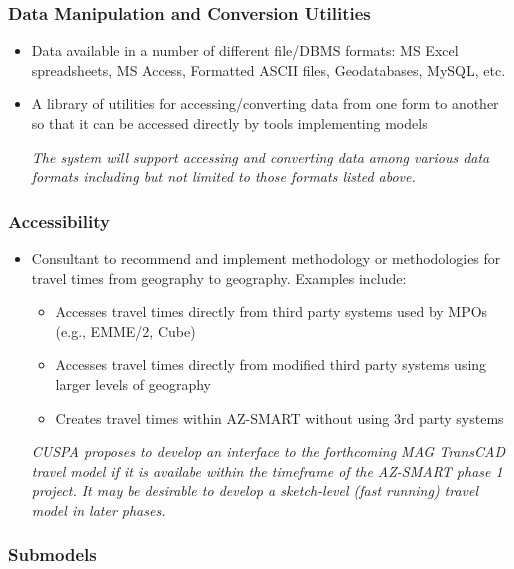 \documentclass[titlepage]{article}
\begin{document}
\subsubsection{Data Manipulation and Conversion Utilities}

\begin{itemize}

\item Data available in a number of different file/DBMS formats: MS Excel spreadsheets, MS Access, Formatted ASCII files, Geodatabases, MySQL, etc.
\item A library of utilities for accessing/converting data from one form to another so that it can be accessed directly by tools implementing models

\emph{The system will support accessing and converting data among various data formats including but not limited to those formats listed above.}

\end{itemize}

\subsubsection{Accessibility}

\begin{itemize}

\item Consultant to recommend and implement methodology or methodologies for travel times from geography to geography. Examples include:
\begin{itemize}
\item Accesses travel times directly from third party systems used by MPOs (e.g., EMME/2, Cube)
\item Accesses travel times directly from modified third party systems using larger levels of geography
\item Creates travel times within AZ-SMART without using 3rd party systems
\end{itemize}

\emph{CUSPA proposes to develop an interface to the forthcoming MAG TransCAD travel model if it is availabe within the timeframe of the AZ-SMART phase 1 project.  It may be desirable to develop a sketch-level (fast running) travel model in later phases.}

\end{itemize}

\subsubsection{Submodels}
\end{document}
